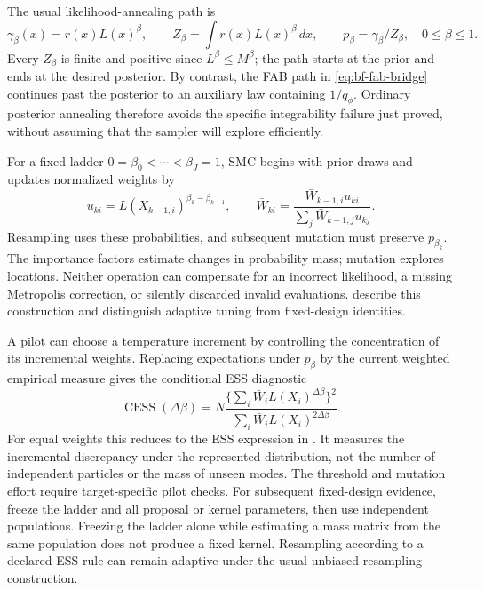 The usual likelihood-annealing path is
\begin{equation}
 \gamma_\beta(x)=r(x)L(x)^\beta,\qquad
 Z_\beta=\int r(x)L(x)^\beta\,dx,\qquad
 p_\beta=\gamma_\beta/Z_\beta,\quad 0\le\beta\le1.
 \label{eq:bf-is-posterior-path}
\end{equation}
Every $Z_\beta$ is finite and positive since $L^\beta\le M^\beta$; the path
starts at the prior and ends at the desired posterior. By contrast, the FAB
path in \eqref{eq:bf-fab-bridge} continues past the posterior to an auxiliary
law containing $1/q_\phi$. Ordinary posterior annealing therefore avoids
the specific integrability failure just proved, without assuming that the
sampler will explore efficiently.

For a fixed ladder $0=\beta_0<\cdots<\beta_J=1$, SMC begins with prior
draws and updates normalized weights by
\begin{equation}
 u_{ki}=L(X_{k-1,i})^{\beta_k-\beta_{k-1}},\qquad
 \bar W_{ki}=
 \frac{\bar W_{k-1,i}u_{ki}}{\sum_j\bar W_{k-1,j}u_{kj}}.
 \label{eq:bf-is-posterior-smc-weight}
\end{equation}
Resampling uses these probabilities, and subsequent mutation must preserve
$p_{\beta_k}$. The importance factors estimate changes in probability mass;
mutation explores locations. Neither operation can compensate for an
incorrect likelihood, a missing Metropolis correction, or silently discarded
invalid evaluations. \citet[Algorithm 2.1 and Sections 2.3--2.4]{dai2022smc}
describe this construction and distinguish adaptive tuning from fixed-design
identities.

A pilot can choose a temperature increment by controlling the concentration
of its incremental weights. Replacing expectations under $p_\beta$ by the
current weighted empirical measure gives the conditional ESS diagnostic
\begin{equation}
 \operatorname{CESS}(\Delta\beta)=
 N\frac{\{\sum_i\bar W_i L(X_i)^{\Delta\beta}\}^2}
          {\sum_i\bar W_i L(X_i)^{2\Delta\beta}}.
 \label{eq:bf-is-weighted-cess}
\end{equation}
For equal weights this reduces to the ESS expression in
\citet[Equation 2.7]{dai2022smc}. It measures the incremental discrepancy
under the represented distribution, not the number of independent particles
or the mass of unseen modes. The threshold and mutation effort require
target-specific pilot checks. For subsequent fixed-design evidence, freeze
the ladder and all proposal or kernel parameters, then use independent
populations. Freezing the ladder alone while estimating a mass matrix from
the same population does not produce a fixed kernel. Resampling according
to a declared ESS rule can remain adaptive under the usual unbiased
resampling construction.

